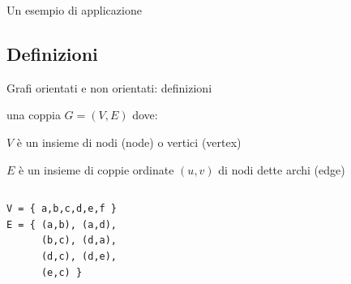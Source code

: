 \begin{frame}{Un esempio di applicazione}


\pause
\bigskip
{}

\end{frame}



\subsection{Definizioni}

\begin{frame}[fragile]{Grafi orientati e non orientati: definizioni}

\vspace{-9pt}
\begin{myboxtitle}
\EE una coppia $G=(V,E)$ dove: 
\BI
\item $V$ è un insieme di \alert{nodi} (\alert{node}) o \alert{vertici} (\alert{vertex})
\item $E$ è un insieme di coppie ordinate $(u,v)$ di nodi dette \alert{archi} (\alert{edge})
\EI
\end{myboxtitle}

\begin{columns}[T]
\begin{lstlisting}
V = { a,b,c,d,e,f }
E = { (a,b), (a,d),
      (b,c), (d,a),
      (d,c), (d,e),
      (e,c) }
\end{lstlisting}
\vspace{-9pt}
\end{columns}

\end{frame}

